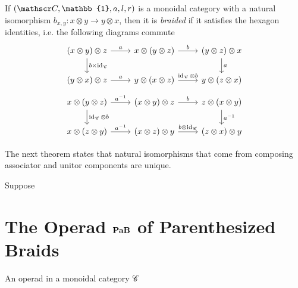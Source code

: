 \begin{definition} \label{braidedMonoidalCategory}
	If $(\sC,\mathbb{1},a,l,r)$ is a monoidal category with a natural isomorphism $b_{x,y}:x\otimes y\to y\otimes x$, then it is \emph{braided} if it satisfies the hexagon identities, i.e. the following diagrams commute
	\[
\begin{tikzcd}
(x\otimes y)\otimes z \arrow[d, "b\times\id_\sC"] \arrow[r, "a"] & x\otimes(y\otimes z) \arrow[r, "b"]                & (y\otimes z)\otimes x \arrow[d, "a"] \\
(y\otimes x)\otimes z \arrow[r, "a"]                             & y\otimes(x\otimes z) \arrow[r, "\id_\sC\otimes b"] & y\otimes(z\otimes x)                
\end{tikzcd}
	\]
	\[\begin{tikzcd}
x\otimes(y\otimes z) \arrow[r, "a^{-1}"] \arrow[d, "\id_\sC\otimes b"] & (x\otimes y)\otimes z \arrow[r, "b"]               & z\otimes(x\otimes y) \arrow[d, "a^{-1}"] \\
x\otimes(z\otimes y) \arrow[r, "a^{-1}"]                               & (x\otimes z)\otimes y \arrow[r, "b\otimes\id_\sC"] & (z\otimes x)\otimes y                   
\end{tikzcd}\]
\end{definition}

The next theorem states that natural isomorphisms that come from composing associator and unitor components are unique.
\begin{theorem}
	Suppose
\end{theorem}
\section{\texorpdfstring{The Operad $\mathbf{PaB}$ of Parenthesized Braids}{The Operad PaB of Parenthesized Braids}}
\begin{definition}[operad]
	An operad in a monoidal category $\mathscr{C}$
\end{definition}